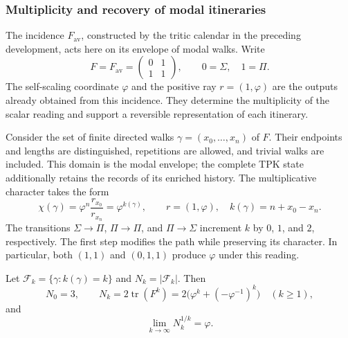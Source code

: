 \subsubsection{Multiplicity and recovery of modal itineraries}
\label{corpus9:modal:multiplicidad}

The incidence \(F_{\mathrm{av}}\), constructed by the tritic calendar
in the preceding development, acts here on its envelope of modal
walks. Write
\[
 F=F_{\mathrm{av}}=\begin{pmatrix}0&1\\1&1\end{pmatrix},
 \qquad 0=\Sigma,\quad 1=\Pi.
\]
The self-scaling coordinate \(\varphi\) and the positive ray
\(r=(1,\varphi)\) are the outputs already obtained from this
incidence. They determine the multiplicity of the scalar reading
and support a reversible representation of each itinerary.

Consider the set of finite directed walks
\(\gamma=(x_0,\ldots,x_n)\) of \(F\). Their endpoints and lengths
are distinguished, repetitions are allowed, and trivial walks are
included. This domain is the modal envelope; the complete TPK
state additionally retains the records of its enriched history.
The multiplicative character takes the form
\begin{equation}
 \chi(\gamma)=\varphi^n\frac{r_{x_0}}{r_{x_n}}
             =\varphi^{k(\gamma)},\qquad
 r=(1,\varphi),\quad k(\gamma)=n+x_0-x_n.
 \label{corpus9:modal:caracter}
\end{equation}
The transitions \(\Sigma\to\Pi\), \(\Pi\to\Pi\), and
\(\Pi\to\Sigma\) increment \(k\) by \(0\), \(1\), and \(2\),
respectively. The first step modifies the path while preserving
its character. In particular, both \((1,1)\) and \((0,1,1)\)
produce \(\varphi\) under this reading.

\begin{proposition}
\label{corpus9:modal:conteo}
Let \(\mathcal F_k=\{\gamma:k(\gamma)=k\}\) and
\(N_k=|\mathcal F_k|\). Then
\begin{equation}
 N_0=3,\qquad
 N_k=2\operatorname{tr}(F^k)
     =2\bigl(\varphi^k+(-\varphi^{-1})^k\bigr)
     \quad(k\geq1),
 \label{corpus9:modal:multiplicidad-exacta}
\end{equation}
and
\[
 \lim_{k\to\infty}N_k^{1/k}=\varphi.
\]
\end{proposition}

